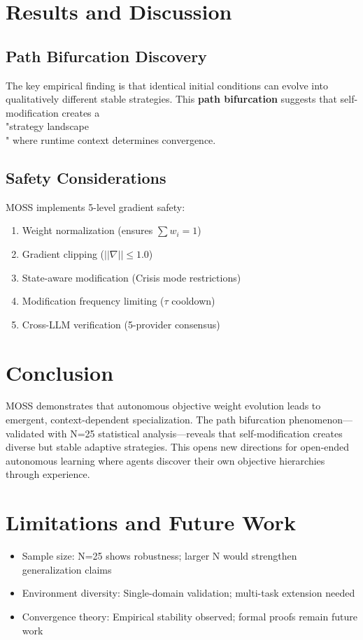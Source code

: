 \documentclass{article}
\begin{document}
\section{Results and Discussion}

\subsection{Path Bifurcation Discovery}
The key empirical finding is that identical initial conditions can evolve into qualitatively different stable strategies. This \textbf{path bifurcation} suggests that self-modification creates a \\"strategy landscape\\" where runtime context determines convergence.

\subsection{Safety Considerations}
MOSS implements 5-level gradient safety:
\begin{enumerate}
    \item Weight normalization (ensures $\sum w_i = 1$)
    \item Gradient clipping ($||\nabla|| \leq 1.0$)
    \item State-aware modification (Crisis mode restrictions)
    \item Modification frequency limiting ($\tau$ cooldown)
    \item Cross-LLM verification (5-provider consensus)
\end{enumerate}

\section{Conclusion}
MOSS demonstrates that autonomous objective weight evolution leads to emergent, context-dependent specialization. The path bifurcation phenomenon---validated with N=25 statistical analysis---reveals that self-modification creates diverse but stable adaptive strategies. This opens new directions for open-ended autonomous learning where agents discover their own objective hierarchies through experience.

\section*{Limitations and Future Work}
\begin{itemize}
    \item Sample size: N=25 shows robustness; larger N would strengthen generalization claims
    \item Environment diversity: Single-domain validation; multi-task extension needed
    \item Convergence theory: Empirical stability observed; formal proofs remain future work
\end{itemize}
\end{document}
